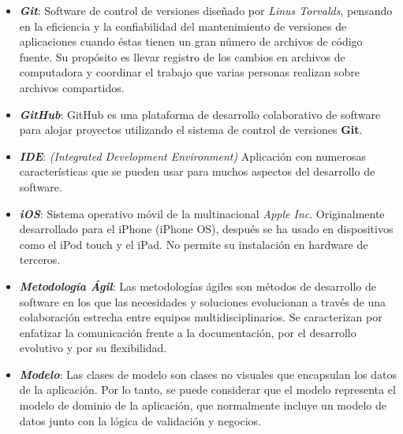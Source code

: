 \begin{itemize}
    \item \textbf{\textit{Git}}: Software de control de versiones 
    diseñado por \emph{Linus Torvalds}, pensando en la eficiencia 
    y la confiabilidad del mantenimiento de versiones de aplicaciones 
    cuando éstas tienen un gran número de archivos de código fuente. 
    Su propósito es llevar registro de los cambios en archivos de 
    computadora y coordinar el trabajo que varias personas realizan 
    sobre archivos compartidos.

    \item \textbf{\textit{GitHub}}: GitHub es una plataforma de desarrollo 
    colaborativo de software para alojar proyectos utilizando el sistema de 
    control de versiones \textbf{Git}.

    \item \textbf{\textit{IDE}}: \emph{(Integrated Development Environment)} 
    Aplicación con numerosas características que se pueden usar para muchos 
    aspectos del desarrollo de software.

    \item \textbf{\textit{iOS}}: Sistema operativo móvil de la multinacional
    \emph{Apple Inc}. Originalmente desarrollado para el iPhone (iPhone OS), 
    después se ha usado en dispositivos como el iPod touch y el iPad. 
    No permite su instalación en hardware de terceros.
    
    \item \textbf{\textit{Metodología Ágil}}: Las metodologías ágiles son 
    métodos de desarrollo de software en los que las necesidades y soluciones 
    evolucionan a través de una colaboración estrecha entre equipos 
    multidisciplinarios. Se caracterizan por enfatizar la comunicación 
    frente a la documentación, por el desarrollo evolutivo y por su 
    flexibilidad.
    
    \item \textbf{\textit{Modelo}}: Las clases de modelo son clases no 
    visuales que encapsulan los datos de la aplicación. Por lo tanto, se 
    puede considerar que el modelo representa el modelo de dominio de la 
    aplicación, que normalmente incluye un modelo de datos junto con la 
    lógica de validación y negocios. 


\end{itemize}
